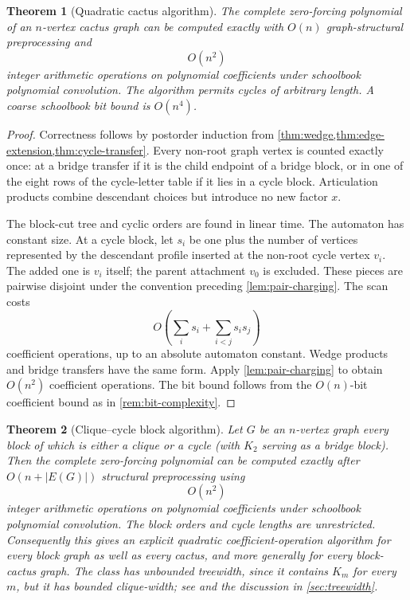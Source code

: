 \documentclass[11pt,reqno]{amsart}
\newtheorem{theorem}{Theorem}[section]
\theoremstyle{definition}
\begin{document}
\begin{theorem}[Quadratic cactus algorithm]\label{thm:cactus}
The complete zero-forcing polynomial of an $n$-vertex cactus graph can be
computed exactly with $O(n)$ graph-structural preprocessing and
\[
  \boxed{O(n^2)}
\]
integer arithmetic operations on polynomial coefficients under schoolbook
polynomial convolution.  The
algorithm permits cycles of arbitrary length.  A coarse schoolbook bit bound
is $O(n^4)$.
\end{theorem}

\begin{proof}
Correctness follows by postorder induction from
\cref{thm:wedge,thm:edge-extension,thm:cycle-transfer}.  Every non-root graph
vertex is counted exactly once: at a bridge transfer if it is the child
endpoint of a bridge block, or in one of the eight rows of the cycle-letter
table if it lies in a cycle block.  Articulation products combine descendant
choices but introduce no new factor $x$.

The block-cut tree and cyclic orders are found in linear time.  The automaton
has constant size.  At a cycle block, let $s_i$ be one plus the number of
vertices represented by the descendant profile inserted at the non-root cycle
vertex $v_i$.  The added one is $v_i$ itself; the parent attachment $v_0$ is
excluded.  These pieces are pairwise disjoint under the convention preceding
\cref{lem:pair-charging}.  The scan costs
\[
  O\!\left(\sum_i s_i+\sum_{i<j}s_is_j\right)
\]
coefficient operations, up to an absolute automaton constant.  Wedge products
and bridge transfers have the same form.  Apply
\cref{lem:pair-charging} to obtain $O(n^2)$ coefficient operations.  The bit
bound follows from the $O(n)$-bit coefficient bound as in
\cref{rem:bit-complexity}.
\end{proof}

\begin{theorem}[Clique--cycle block algorithm]\label{thm:clique-cycle}
Let $G$ be an $n$-vertex graph every block of which is either a clique or a
cycle (with $K_2$ serving as a bridge block).  Then the complete zero-forcing
polynomial can be computed exactly after $O(n+|E(G)|)$ structural preprocessing
using
\[
  \boxed{O(n^2)}
\]
integer arithmetic operations on polynomial coefficients under schoolbook
polynomial convolution.  The block orders and cycle lengths are unrestricted.
Consequently this gives an explicit quadratic coefficient-operation algorithm
for every block graph as well as every cactus, and more generally for every
block-cactus graph.  The class has unbounded treewidth, since it contains
$K_m$ for every $m$, but it has bounded clique-width; see
\cite{Gurski2017} and the discussion in \cref{sec:treewidth}.
\end{theorem}
\end{document}
